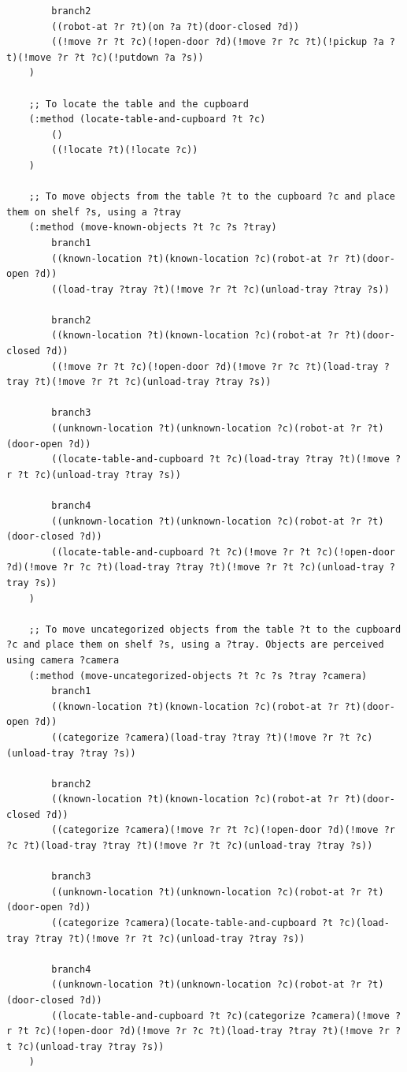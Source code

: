 \documentclass[paper=a4, fontsize=11pt]{scrartcl}
\begin{document}
\begin{lstlisting}
		branch2
		((robot-at ?r ?t)(on ?a ?t)(door-closed ?d))
		((!move ?r ?t ?c)(!open-door ?d)(!move ?r ?c ?t)(!pickup ?a ?t)(!move ?r ?t ?c)(!putdown ?a ?s))
	)
	
	;; To locate the table and the cupboard
	(:method (locate-table-and-cupboard ?t ?c)
		()
		((!locate ?t)(!locate ?c))
	)
	
	;; To move objects from the table ?t to the cupboard ?c and place them on shelf ?s, using a ?tray
	(:method (move-known-objects ?t ?c ?s ?tray)
		branch1
		((known-location ?t)(known-location ?c)(robot-at ?r ?t)(door-open ?d))
		((load-tray ?tray ?t)(!move ?r ?t ?c)(unload-tray ?tray ?s))
		
		branch2
		((known-location ?t)(known-location ?c)(robot-at ?r ?t)(door-closed ?d))
		((!move ?r ?t ?c)(!open-door ?d)(!move ?r ?c ?t)(load-tray ?tray ?t)(!move ?r ?t ?c)(unload-tray ?tray ?s))
		
		branch3
		((unknown-location ?t)(unknown-location ?c)(robot-at ?r ?t)(door-open ?d))
		((locate-table-and-cupboard ?t ?c)(load-tray ?tray ?t)(!move ?r ?t ?c)(unload-tray ?tray ?s))
		
		branch4
		((unknown-location ?t)(unknown-location ?c)(robot-at ?r ?t)(door-closed ?d))
		((locate-table-and-cupboard ?t ?c)(!move ?r ?t ?c)(!open-door ?d)(!move ?r ?c ?t)(load-tray ?tray ?t)(!move ?r ?t ?c)(unload-tray ?tray ?s))
	)
	
	;; To move uncategorized objects from the table ?t to the cupboard ?c and place them on shelf ?s, using a ?tray. Objects are perceived using camera ?camera
	(:method (move-uncategorized-objects ?t ?c ?s ?tray ?camera)
		branch1
		((known-location ?t)(known-location ?c)(robot-at ?r ?t)(door-open ?d))
		((categorize ?camera)(load-tray ?tray ?t)(!move ?r ?t ?c)(unload-tray ?tray ?s))
		
		branch2
		((known-location ?t)(known-location ?c)(robot-at ?r ?t)(door-closed ?d))
		((categorize ?camera)(!move ?r ?t ?c)(!open-door ?d)(!move ?r ?c ?t)(load-tray ?tray ?t)(!move ?r ?t ?c)(unload-tray ?tray ?s))
		
		branch3
		((unknown-location ?t)(unknown-location ?c)(robot-at ?r ?t)(door-open ?d))
		((categorize ?camera)(locate-table-and-cupboard ?t ?c)(load-tray ?tray ?t)(!move ?r ?t ?c)(unload-tray ?tray ?s))
		
		branch4
		((unknown-location ?t)(unknown-location ?c)(robot-at ?r ?t)(door-closed ?d))
		((locate-table-and-cupboard ?t ?c)(categorize ?camera)(!move ?r ?t ?c)(!open-door ?d)(!move ?r ?c ?t)(load-tray ?tray ?t)(!move ?r ?t ?c)(unload-tray ?tray ?s))
	)
	

\end{lstlisting}
\end{document}
